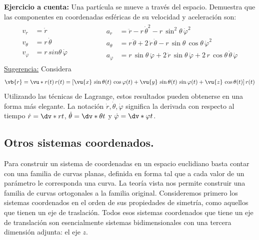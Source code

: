 \textbf{Ejercicio a cuenta:} Una partícula se mueve a través del espacio. Demuestra que las componentes en coordenadas esféricas de su velocidad y aceleración son:
\begin{align*}
\begin{aligned}
v_{r} &= \dot{r} \\
v_{\theta} &= r \, \dot{\theta} \\
v_{\varphi} &= r \, sin \theta \, \dot{\varphi}
\end{aligned}
\hspace{2cm}
\begin{aligned}
a_{r} &= \ddot{r} - r \, \dot{\theta}^{2} - r \, \sin^{2} \theta \, \dot{\varphi}^{2} \\
a_{\theta} &= r \, \ddot{\theta} + 2 \, \dot{r} \, \dot{\theta} - r \, \sin \theta \, \cos \theta \, \dot{\varphi}^{2} \\
a_{\varphi} &= r \, \sin \theta \, \ddot{\varphi} +  2 \, \dot{r} \, \sin \theta \, \dot{\varphi} + 2 \, r \, \cos \theta \, \dot{\theta} \, \dot{\varphi}
\end{aligned}
\end{align*}
\underline{Sugerencia:} Considera
\begin{align*}
\vb{r} = \vu*{r} (t) \, r(t) = [ \vu{x} \, \sin \theta (t)  \, \cos \varphi (t) + \vu{y} \, \sin \theta (t)  \, \sin \varphi (t) + \vu{z} \, \cos \theta (t) ] \, r(t)
\end{align*}
Utilizando las técnicas de Lagrange, estos resultados pueden obtenerse en una forma más elegante. La notación $\dot{r}, \dot{\theta}, \dot{\varphi}$ significa la derivada con respecto al tiempo $\dot{r} = \dv*{r}{t}$, $\dot{\theta} = \dv*{\theta}{t}$ y $\dot{\varphi} = \dv*{\varphi}{t}$.

\subsection*{Otros sistemas coordenados.}

Para construir un sistema de coordenadas en un espacio euclidiano basta contar con una familia de curvas planas, definida en forma tal que a cada valor de un parámetro le corresponda una curva. La teoría vista nos permite construir una familia de curvas ortogonales a la familia original. Consideremos primero los sistemas coordenados en el orden de sus propiedades de simetría, como aquellos que tienen un eje de traslación. Todos esos sistemas coordenados que tiene un eje de translación son esencialmente sistemas bidimensionales con una tercera dimensión adjunta: el eje $z$.


